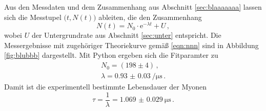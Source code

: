 Aus den Messdaten und dem Zusammenhang aus Abschnitt \ref{sec:blaaaaaaa} lassen sich die
Messtupel $\big(t, N(t)\big)$ ableiten, die den Zusammenhang
\begin{equation}
	\label{eqn:nnn}
	N(t) = N_0 \cdot \mathrm{e}^{-\lambda t} + U \, \mathrm{,}
\end{equation}
wobei $U$ der Untergrundrate aus Abschnitt \ref{sec:unter} entspricht.
Die Messergebnisse mit zugehöriger Theoriekurve gemäß \eqref{eqn:nnn} sind in Abbildung
\ref{fig:blubbb} dargestellt.
Mit Python \cite{numpy} ergeben sich die Fitparamter zu
\begin{align*}
	N_0 = (198 \pm 4 ) \, \mathrm{,} \\
	\lambda = \SI{0.93(3)}{\per\micro\second} \, \mathrm{.}
\end{align*}
Damit ist die experimentell bestimmte Lebensdauer der Myonen
\begin{equation*}
	\tau = \frac{1}{\lambda} = \SI{1.069(29)}{\micro\second} \, \mathrm{.}
\end{equation*}
